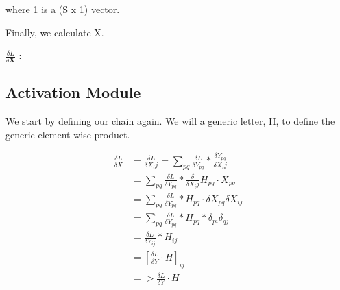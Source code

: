 where 1 is a (S x 1) vector.

Finally, we calculate X.

{\Large $\frac{\delta L}{\delta \textbf{X}}$ }:
\vspace{1cm}

\subsection{Activation Module}
We start by defining our chain again. We will a generic letter, H, to define the generic element-wise
product.

\begin{align}
    \frac{\delta L}{\delta X} 
    &= \frac{\delta L}{\delta X_ij} = \sum_{pq} \frac{\delta L}{\delta Y_{pq}} * \frac{\delta Y_{pq}}{\delta X_ij} \\
    &= \sum_{pq} \frac{\delta L}{\delta Y_{pq}} * \frac{\delta}{\delta X_ij} H_{pq} \cdot X_{pq} \\
    &= \sum_{pq} \frac{\delta L}{\delta Y_{pq}} * H_{pq} \cdot \delta{X_{pq}}{\delta X_{ij}} \\
    &= \sum_{pq} \frac{\delta L}{\delta Y_{pq}} * H_{pq} * \delta_{pi} \delta_{qj} \\
    &= \frac{\delta L}{\delta Y_{ij}} * H_{ij} \\
    &= [\frac{\delta L}{\delta Y} \cdot H]_{ij} \\
    &=> \frac{\delta L}{\delta Y} \cdot H \\
\end{align}


